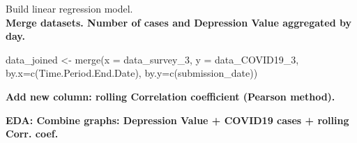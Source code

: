 \documentclass[
]{article}
\newenvironment{Shaded}{\begin{snugshade}}{\end{snugshade}}
\newcommand{\AttributeTok}[1]{\textcolor[rgb]{0.77,0.63,0.00}{#1}}
\newcommand{\ConstantTok}[1]{\textcolor[rgb]{0.00,0.00,0.00}{#1}}
\newcommand{\ControlFlowTok}[1]{\textcolor[rgb]{0.13,0.29,0.53}{\textbf{#1}}}
\newcommand{\DecValTok}[1]{\textcolor[rgb]{0.00,0.00,0.81}{#1}}
\newcommand{\FunctionTok}[1]{\textcolor[rgb]{0.00,0.00,0.00}{#1}}
\newcommand{\NormalTok}[1]{#1}
\newcommand{\OtherTok}[1]{\textcolor[rgb]{0.56,0.35,0.01}{#1}}
\newcommand{\SpecialCharTok}[1]{\textcolor[rgb]{0.00,0.00,0.00}{#1}}
\newcommand{\StringTok}[1]{\textcolor[rgb]{0.31,0.60,0.02}{#1}}
\begin{document}
Build linear regression model.\\
\textbf{Merge datasets. Number of cases and Depression Value aggregated
by day.}

\begin{Shaded}
\begin{Highlighting}[]
\NormalTok{data\_joined }\OtherTok{\textless{}{-}} \FunctionTok{merge}\NormalTok{(}\AttributeTok{x =}\NormalTok{ data\_survey\_3, }\AttributeTok{y =}\NormalTok{ data\_COVID19\_3, }\AttributeTok{by.x=}\FunctionTok{c}\NormalTok{(}\StringTok{\textquotesingle{}Time.Period.End.Date\textquotesingle{}}\NormalTok{), }\AttributeTok{by.y=}\FunctionTok{c}\NormalTok{(}\StringTok{\textquotesingle{}submission\_date\textquotesingle{}}\NormalTok{))}
\end{Highlighting}
\end{Shaded}

\textbf{Add new column: rolling Correlation coefficient (Pearson
method).}

\begin{Shaded}
\end{Shaded}

\textbf{EDA: Combine graphs: Depression Value + COVID19 cases + rolling
Corr. coef.}
\end{document}
